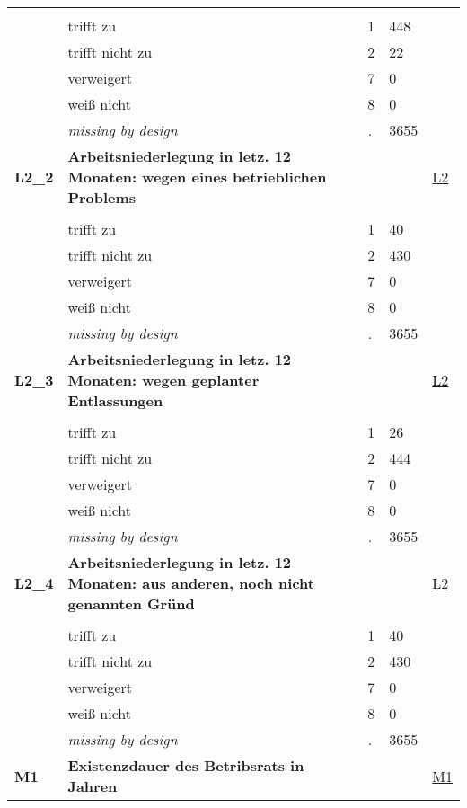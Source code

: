 \begin{longtable}{| L{2.65cm} | L{8cm} | C{1.5cm} | R{1.25cm} | C{2.25cm}  |}
   &  &  &  &  \\ 
   & trifft zu & 1 & 448 &  \\ 
   & trifft nicht zu & 2 & 22 &  \\ 
   & verweigert & 7 & 0 &  \\ 
   & weiß nicht & 8 & 0 &  \\ 
   & \textit{missing by design} & \textit{.} & 3655 &  \\ 
   \midrule
\textbf{L2\_2}\label{var:L2:2} & \textbf{Arbeitsniederlegung in letz. 12 Monaten: wegen eines betrieblichen Problems} &  &  & \hyperref[L2]{L2} \\ 
   &  &  &  &  \\ 
   & trifft zu & 1 & 40 &  \\ 
   & trifft nicht zu & 2 & 430 &  \\ 
   & verweigert & 7 & 0 &  \\ 
   & weiß nicht & 8 & 0 &  \\ 
   & \textit{missing by design} & \textit{.} & 3655 &  \\ 
   \midrule
\textbf{L2\_3}\label{var:L2:3} & \textbf{Arbeitsniederlegung in letz. 12 Monaten: wegen geplanter Entlassungen} &  &  & \hyperref[L2]{L2} \\ 
   &  &  &  &  \\ 
   & trifft zu & 1 & 26 &  \\ 
   & trifft nicht zu & 2 & 444 &  \\ 
   & verweigert & 7 & 0 &  \\ 
   & weiß nicht & 8 & 0 &  \\ 
   & \textit{missing by design} & \textit{.} & 3655 &  \\ 
   \midrule
\textbf{L2\_4}\label{var:L2:4} & \textbf{Arbeitsniederlegung in letz. 12 Monaten: aus anderen, noch nicht genannten Gründ} &  &  & \hyperref[L2]{L2} \\ 
   &  &  &  &  \\ 
   & trifft zu & 1 & 40 &  \\ 
   & trifft nicht zu & 2 & 430 &  \\ 
   & verweigert & 7 & 0 &  \\ 
   & weiß nicht & 8 & 0 &  \\ 
   & \textit{missing by design} & \textit{.} & 3655 &  \\ 
   \midrule
\textbf{M1}\label{var:M1} & \textbf{Existenzdauer des Betribsrats in Jahren} &  &  & \hyperref[M1]{M1} \\ 

\end{longtable}
